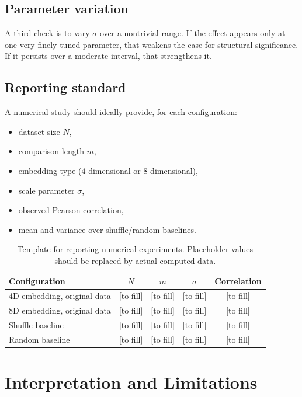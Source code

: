 \documentclass[11pt,a4paper]{article}
\begin{document}
	\subsection{Parameter variation}
	
	A third check is to vary \(\sigma\) over a nontrivial range. If the effect appears only at one very finely tuned parameter, that weakens the case for structural significance. If it persists over a moderate interval, that strengthens it.
	
	\subsection{Reporting standard}
	
	A numerical study should ideally provide, for each configuration:
	\begin{itemize}
		\item dataset size \(N\),
		\item comparison length \(m\),
		\item embedding type (\(4\)-dimensional or \(8\)-dimensional),
		\item scale parameter \(\sigma\),
		\item observed Pearson correlation,
		\item mean and variance over shuffle/random baselines.
	\end{itemize}
	
	\begin{table}[ht]
		\centering
		\begin{tabular}{lcccc}
			\toprule
			Configuration & \(N\) & \(m\) & \(\sigma\) & Correlation \\
			\midrule
			4D embedding, original data & [to fill] & [to fill] & [to fill] & [to fill] \\
			8D embedding, original data & [to fill] & [to fill] & [to fill] & [to fill] \\
			Shuffle baseline            & [to fill] & [to fill] & [to fill] & [to fill] \\
			Random baseline             & [to fill] & [to fill] & [to fill] & [to fill] \\
			\bottomrule
		\end{tabular}
		\caption{Template for reporting numerical experiments. Placeholder values should be replaced by actual computed data.}
		\label{tab:results}
	\end{table}
	
	\section{Interpretation and Limitations}
	
\end{document}
